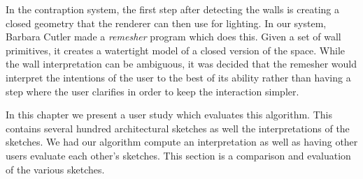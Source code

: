
In the contraption system, the first step after detecting the walls is creating a closed geometry that the renderer can then use for lighting.  In our system, Barbara Cutler made a \emph{remesher} program which does this.  Given a set of wall primitives, it creates a watertight model of a closed version of the space.  While the wall interpretation can be ambiguous, it was decided that the remesher would interpret the intentions of the user to the best of its ability rather than having a step where the user clarifies in order to keep the interaction simpler.  

In this chapter we present a user study which evaluates this algorithm.  This contains several hundred architectural sketches as well the interpretations of the sketches.  We had our algorithm compute an interpretation as well as having other users evaluate each other's sketches.  This section is a comparison and evaluation of the various sketches.

